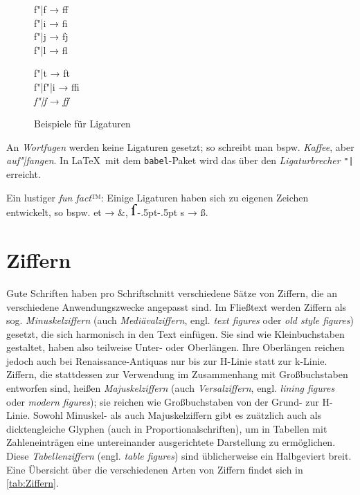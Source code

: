 \begin{figure}
  \centering

  \begin{minipage}{.15\textwidth}
    \centering\Large
    f"|f → ff\\
    f"|i → fi\\
    f"|j → fj\\
    f"|l → fl
  \end{minipage}
  \hspace{.1\textwidth}
  \begin{minipage}{.15\textwidth}
    \centering\Large
    f"|t → ft\\
    f"|f"|i → ffi\\
    \emph{f"|f} → \emph{ff}
  \end{minipage}

  \caption{Beispiele für Ligaturen}
  \label{fig:Ligatur}
\end{figure}

An \emph{Wortfugen} werden keine Ligaturen gesetzt; so schreibt man
bspw. \emph{Kaffee}, aber \emph{auf"|fangen}.  In \LaTeX\ mit dem
\texttt{babel}-Paket wird das über den \emph{Ligaturbrecher} \verb!"|!
erreicht.

\newcommand*{\longS}{\includegraphics{long_s}\kern-.5pt}

Ein lustiger \emph{fun fact}™: Einige Ligaturen haben sich zu eigenen
Zeichen entwickelt, so bspw. et → \&,  \longS\kern-.5pt s → ß.

\section{Ziffern}
\label{sec:Ziffern}

Gute Schriften haben pro Schriftschnitt verschiedene Sätze von
Ziffern, die an verschiedene Anwendungszwecke angepasst sind.  Im
Fließtext werden Ziffern als sog. \emph{Minuskelziffern} (auch
\emph{Mediävalziffern}, engl. \emph{\foreignlanguage{british}{text
    figures}} oder \emph{\foreignlanguage{british}{old style
    figures}}) gesetzt, die sich harmonisch in den Text einfügen.  Sie
sind wie Kleinbuchstaben gestaltet, haben also teilweise Unter- oder
Oberlängen.  Ihre Oberlängen reichen jedoch auch bei
Renaissance-Antiquas nur bis zur H-Linie statt zur k-Linie.  Ziffern,
die stattdessen zur Verwendung im Zusammenhang mit Großbuchstaben
entworfen sind, heißen \emph{Majuskelziffern} (auch
\emph{Versalziffern}, engl. \emph{\foreignlanguage{british}{lining
    figures}} oder \emph{\foreignlanguage{british}{modern figures}});
sie reichen wie Großbuchstaben von der Grund- zur H-Linie.  Sowohl
Minuskel- als auch Majuskelziffern gibt es zuätzlich auch als
dicktengleiche Glyphen (auch in Proportionalschriften), um in Tabellen
mit Zahleneinträgen eine untereinander ausgerichtete Darstellung zu
ermöglichen.  Diese \emph{Tabellenziffern}
(engl. \emph{\foreignlanguage{british}{table figures}}) sind
üblicherweise ein Halbgeviert breit.  Eine Übersicht über die
verschiedenen Arten von Ziffern findet sich in \cref{tab:Ziffern}.

